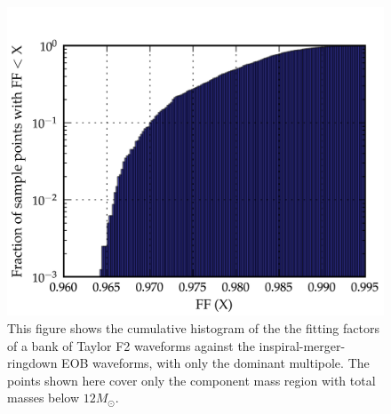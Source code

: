 \documentclass[aps,
prd,
amsmath,
amssymb,
twocolumn,
floatfix,
groupedaddress]{revtex4-1}
\begin{document}
\begin{figure}
\centering
\includegraphics[scale=0.04, clip=false, totalheight=0.3\textheight, width=\columnwidth]{EOB22vsF2cutcumhist12.png}
\caption{\label{fig:cumhist_f2eob22_cut12}This figure shows the cumulative histogram of the the fitting factors of a bank of Taylor F2 waveforms against the inspiral-merger-ringdown EOB waveforms, with only the dominant multipole. The points shown here cover only the component mass region with total masses below $12M_{\odot}$.}
\end{figure}
\end{document}
